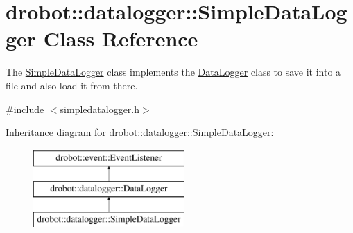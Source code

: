 \hypertarget{classdrobot_1_1datalogger_1_1SimpleDataLogger}{\section{drobot\-:\-:datalogger\-:\-:Simple\-Data\-Logger Class Reference}
\label{classdrobot_1_1datalogger_1_1SimpleDataLogger}
}


The \hyperlink{classdrobot_1_1datalogger_1_1SimpleDataLogger}{Simple\-Data\-Logger} class implements the \hyperlink{classdrobot_1_1datalogger_1_1DataLogger}{Data\-Logger} class to save it into a file and also load it from there.  




{\ttfamily \#include $<$simpledatalogger.\-h$>$}

Inheritance diagram for drobot\-:\-:datalogger\-:\-:Simple\-Data\-Logger\-:\begin{figure}[H]
\begin{center}
\leavevmode
\includegraphics[height=3.000000cm]{classdrobot_1_1datalogger_1_1SimpleDataLogger}
\end{center}
\end{figure}

